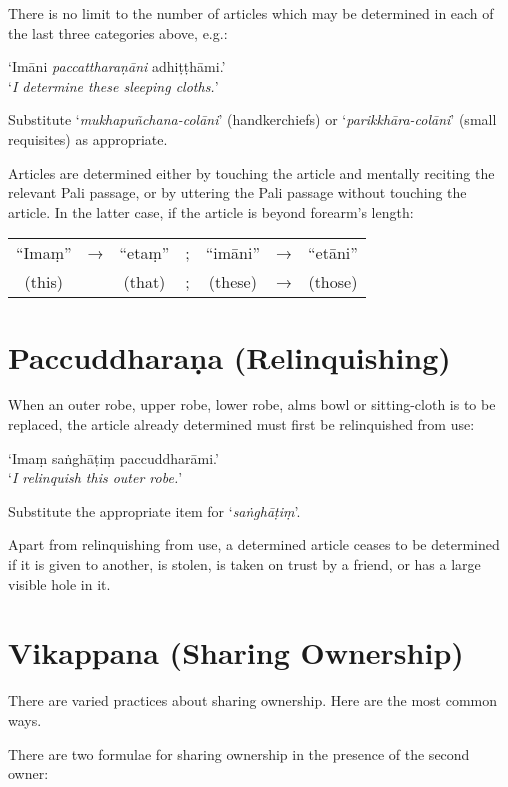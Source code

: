 There is no limit to the number of articles which may be determined in each of
the last three categories above, e.g.:

‘Imāni \emph{paccattharaṇāni} adhiṭṭhāmi.’\\
‘\emph{I determine these sleeping cloths.}’

Substitute ‘\emph{mukhapuñchana-colāni}’ (handkerchiefs) or
‘\emph{parikkhāra-colāni}’ (small requisites) as appropriate.

Articles are determined either by touching the article and mentally reciting the
relevant Pali passage, or by uttering the Pali passage without touching the
article. In the latter case, if the article is beyond forearm's length:

\begin{tabular}{c c c c c c c}
“Imaṃ” & → & “etaṃ” & ; & “imāni” & → & “etāni”\\
(this) &   & (that) & ; & (these) & → & (those)\\
\end{tabular}

\section{Paccuddharaṇa (Relinquishing)}

When an outer robe, upper robe, lower robe, alms bowl or sitting-cloth is to be
replaced, the article already determined must first be relinquished from use:

‘Imaṃ saṅghāṭiṃ paccuddharāmi.’\\
‘\emph{I relinquish this outer robe.}’ 

Substitute the appropriate item for ‘\emph{saṅghāṭiṃ}’.

Apart from relinquishing from use, a determined article ceases to be determined
if it is given to another, is stolen, is taken on trust by a friend, or has a
large visible hole in it.

\section{Vikappana (Sharing Ownership)}

There are varied practices about sharing ownership. Here are the most common
ways.


There are two formulae for sharing ownership in the presence of the second
owner:

